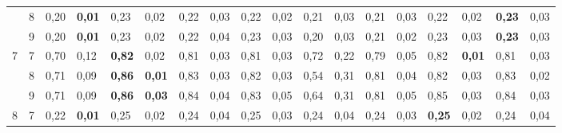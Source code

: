 \documentclass[conference]{IEEEtran}
\begin{document}
\begin{table}[]
\begin{tabular}{|cl|ll|ll|ll|ll|ll|ll|ll|ll|}
		\multicolumn{1}{|c|}{}                    & 8 & \multicolumn{1}{l|}{0,20} & \textbf{0,01} & \multicolumn{1}{l|}{0,23}          & 0,02          & \multicolumn{1}{l|}{0,22}          & 0,03 & \multicolumn{1}{l|}{0,22}          & 0,02 & \multicolumn{1}{l|}{0,21}                 & 0,03 & \multicolumn{1}{l|}{0,21} & 0,03 & \multicolumn{1}{l|}{0,22}          & 0,02          & \multicolumn{1}{l|}{\textbf{0,23}} & 0,03          \\ \cline{2-18} 
		\multicolumn{1}{|c|}{}                    & 9 & \multicolumn{1}{l|}{0,20} & \textbf{0,01} & \multicolumn{1}{l|}{0,23}          & 0,02          & \multicolumn{1}{l|}{0,22}          & 0,04 & \multicolumn{1}{l|}{0,23}          & 0,03 & \multicolumn{1}{l|}{0,20}                 & 0,03 & \multicolumn{1}{l|}{0,21} & 0,02 & \multicolumn{1}{l|}{0,23}          & 0,03          & \multicolumn{1}{l|}{\textbf{0,23}} & 0,03          \\ \hline
		\multicolumn{1}{|c|}{\multirow{3}{*}{7}}  & 7 & \multicolumn{1}{l|}{0,70} & 0,12          & \multicolumn{1}{l|}{\textbf{0,82}} & 0,02          & \multicolumn{1}{l|}{0,81}          & 0,03 & \multicolumn{1}{l|}{0,81}          & 0,03 & \multicolumn{1}{l|}{0,72}                 & 0,22 & \multicolumn{1}{l|}{0,79} & 0,05 & \multicolumn{1}{l|}{0,82}          & \textbf{0,01} & \multicolumn{1}{l|}{0,81}          & 0,03          \\ \cline{2-18} 
		\multicolumn{1}{|c|}{}                    & 8 & \multicolumn{1}{l|}{0,71} & 0,09          & \multicolumn{1}{l|}{\textbf{0,86}} & \textbf{0,01} & \multicolumn{1}{l|}{0,83}          & 0,03 & \multicolumn{1}{l|}{0,82}          & 0,03 & \multicolumn{1}{l|}{0,54}                 & 0,31 & \multicolumn{1}{l|}{0,81} & 0,04 & \multicolumn{1}{l|}{0,82}          & 0,03          & \multicolumn{1}{l|}{0,83}          & 0,02          \\ \cline{2-18} 
		\multicolumn{1}{|c|}{}                    & 9 & \multicolumn{1}{l|}{0,71} & 0,09          & \multicolumn{1}{l|}{\textbf{0,86}} & \textbf{0,03} & \multicolumn{1}{l|}{0,84}          & 0,04 & \multicolumn{1}{l|}{0,83}          & 0,05 & \multicolumn{1}{l|}{0,64}                 & 0,31 & \multicolumn{1}{l|}{0,81} & 0,05 & \multicolumn{1}{l|}{0,85}          & 0,03          & \multicolumn{1}{l|}{0,84}          & 0,03          \\ \hline
		\multicolumn{1}{|c|}{\multirow{3}{*}{8}}  & 7 & \multicolumn{1}{l|}{0,22} & \textbf{0,01} & \multicolumn{1}{l|}{0,25}          & 0,02          & \multicolumn{1}{l|}{0,24}          & 0,04 & \multicolumn{1}{l|}{0,25}          & 0,03 & \multicolumn{1}{l|}{0,24}                 & 0,04 & \multicolumn{1}{l|}{0,24} & 0,03 & \multicolumn{1}{l|}{\textbf{0,25}} & 0,02          & \multicolumn{1}{l|}{0,24}          & 0,04          \\ \cline{2-18} 

\end{tabular}
\end{table}
\end{document}
